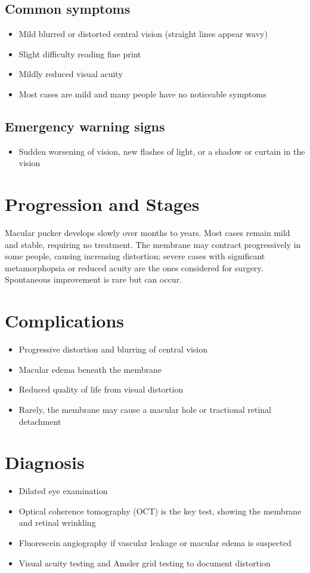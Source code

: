 \subsection{Common symptoms}
\begin{itemize}[noitemsep]
  \item Mild blurred or distorted central vision (straight lines appear wavy)
  \item Slight difficulty reading fine print
  \item Mildly reduced visual acuity
  \item Most cases are mild and many people have no noticeable symptoms
\end{itemize}
\subsection{Emergency warning signs}
\begin{itemize}[noitemsep]
  \item Sudden worsening of vision, new flashes of light, or a shadow or curtain in the vision
\end{itemize}
\section{Progression and Stages}
Macular pucker develops slowly over months to years. Most cases remain mild and stable, requiring no treatment. The membrane may contract progressively in some people, causing increasing distortion; severe cases with significant metamorphopsia or reduced acuity are the ones considered for surgery. Spontaneous improvement is rare but can occur.
\section{Complications}
\begin{itemize}[noitemsep]
  \item Progressive distortion and blurring of central vision
  \item Macular edema beneath the membrane
  \item Reduced quality of life from visual distortion
  \item Rarely, the membrane may cause a macular hole or tractional retinal detachment
\end{itemize}
\section{Diagnosis}
\begin{itemize}[noitemsep]
  \item Dilated eye examination
  \item Optical coherence tomography (OCT) is the key test, showing the membrane and retinal wrinkling
  \item Fluorescein angiography if vascular leakage or macular edema is suspected
  \item Visual acuity testing and Amsler grid testing to document distortion
\end{itemize}
